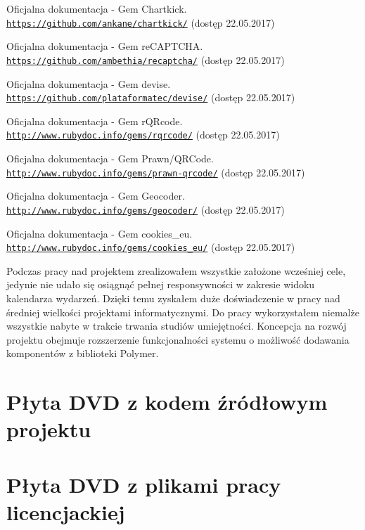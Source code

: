 \documentclass[openright]{xmgr}
\begin{document}
\begin{thebibliography}{9}
Oficjalna dokumentacja - Gem Chartkick.
\\\texttt{\url{https://github.com/ankane/chartkick/}} (dostęp 22.05.2017)

Oficjalna dokumentacja - Gem reCAPTCHA.
\\\texttt{\url{https://github.com/ambethia/recaptcha/}} (dostęp 22.05.2017)

Oficjalna dokumentacja - Gem devise.
\\\texttt{\url{https://github.com/plataformatec/devise/}} (dostęp 22.05.2017)

Oficjalna dokumentacja - Gem rQRcode.
\\\texttt{\url{http://www.rubydoc.info/gems/rqrcode/}} (dostęp 22.05.2017)

Oficjalna dokumentacja - Gem Prawn/QRCode.
\\\texttt{\url{http://www.rubydoc.info/gems/prawn-qrcode/}} (dostęp 22.05.2017)

Oficjalna dokumentacja - Gem Geocoder.
\\\texttt{\url{http://www.rubydoc.info/gems/geocoder/}} (dostęp 22.05.2017)

Oficjalna dokumentacja - Gem cookies\_eu.
\\\texttt{\url{http://www.rubydoc.info/gems/cookies_eu/}} (dostęp 22.05.2017)

\end{thebibliography}


\summary
Podczas pracy nad projektem zrealizowałem wszystkie założone wcześniej cele, jedynie nie udało się osiągnąć pełnej responsywności w zakresie widoku kalendarza wydarzeń. Dzięki temu zyskałem duże doświadczenie w pracy nad średniej wielkości projektami informatycznymi. Do pracy wykorzystałem niemalże wszystkie nabyte w trakcie trwania studiów umiejętności. Koncepcja na rozwój projektu obejmuje rozszerzenie funkcjonalności systemu o możliwość dodawania komponentów z biblioteki Polymer.

\appendix
\chapter{Płyta DVD z kodem źródłowym projektu}



\chapter{Płyta DVD z plikami pracy licencjackiej}



\listoffigures

\lstlistoflistings
{}%

\oswiadczenie
\end{document}
